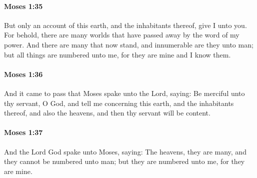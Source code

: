 		\paragraph{Moses 1:35} %
			\label{MOSES-1-35}

			But only an account of this earth, and the inhabitants thereof, give I unto you. For behold, there are many worlds that have passed away by the word of my power. And there are many that now stand, and innumerable are they unto man; but all things are numbered unto me, for they are mine and I know them.


		\paragraph{Moses 1:36} %
			\label{MOSES-1-36}

			And it came to pass that Moses spake unto the Lord, saying: Be merciful unto thy servant, O God, and tell me concerning this earth, and the inhabitants thereof, and also the heavens, and then thy servant will be content.


		\paragraph{Moses 1:37} %
			\label{MOSES-1-37}

			And the Lord God spake unto Moses, saying: The heavens, they are many, and they cannot be numbered unto man; but they are numbered unto me, for they are mine.

